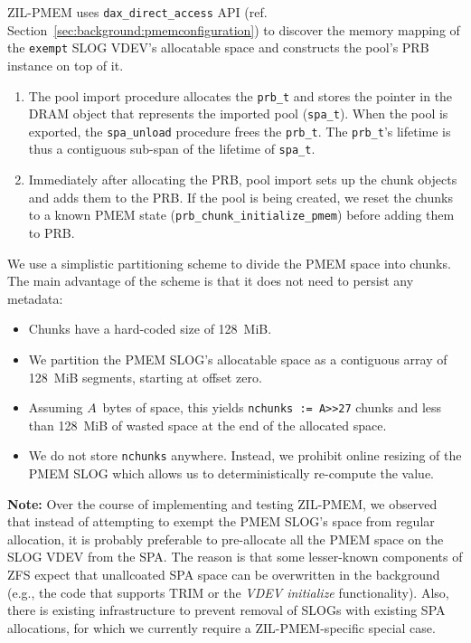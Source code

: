 \documentclass[12pt,a4paper,twoside]{book}
\begin{document}
ZIL-PMEM uses \lstinline{dax_direct_access} API (ref. Section~\ref{sec:background:pmemconfiguration}) to discover the memory mapping of the \lstinline{exempt} SLOG VDEV's allocatable space and constructs the pool's PRB instance on top of it.
\begin{enumerate}
\item The pool import procedure allocates the \lstinline{prb_t} and stores the pointer in the DRAM object that represents the imported pool (\lstinline{spa_t}).
When the pool is exported, the \lstinline{spa_unload} procedure frees the \lstinline{prb_t}.
The \lstinline{prb_t}'s lifetime is thus a contiguous sub-span of the lifetime of \lstinline{spa_t}.
\item  Immediately after allocating the PRB, pool import sets up the chunk objects and adds them to the PRB.
If the pool is being created, we reset the chunks to a known PMEM state (\lstinline{prb_chunk_initialize_pmem}) before adding them to PRB.
\end{enumerate}

We use a simplistic partitioning scheme to divide the PMEM space into chunks.
The main advantage of the scheme is that it does not need to persist any metadata:
\begin{itemize}[noitemsep]
    \item Chunks have a hard-coded size of 128~MiB.
    \item We partition the PMEM SLOG's allocatable space as a contiguous array of 128~MiB segments, starting at offset zero.
    \item Assuming $A$~bytes of space, this yields \lstinline{nchunks := A>>27} chunks and less than 128~MiB of wasted space at the end of the allocated space.
    \item We do not store \lstinline{nchunks} anywhere. Instead, we prohibit online resizing of the PMEM SLOG which allows us to deterministically re-compute the value.
\end{itemize}

\textbf{Note:} Over the course of implementing and testing ZIL-PMEM, we observed that instead of attempting to exempt the PMEM SLOG's space from regular allocation, it is probably preferable to pre-allocate all the PMEM space on the SLOG VDEV from the SPA.
The reason is that some lesser-known components of ZFS expect that unallcoated SPA space can be overwritten in the background (e.g., the code that supports TRIM or the \textit{VDEV initialize} functionality).
Also, there is existing infrastructure to prevent removal of SLOGs with existing SPA allocations, for which we currently require a ZIL-PMEM-specific special case.
\end{document}
